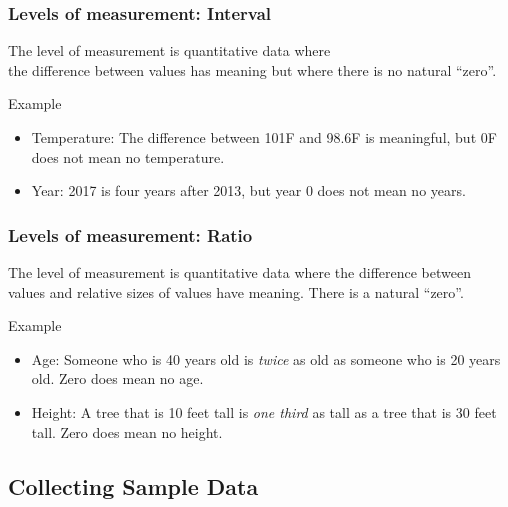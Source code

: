 \documentclass[xcolor=table, handout]{beamer}
\begin{document}
\begin{frame}
\frametitle{Levels of measurement: Interval}
\begin{block}{}
\large The  level of measurement is quantitative data where\\ the difference between values has meaning but where there is no natural ``zero''.
\end{block}
\pause
\begin{exampleblock}{Example}
\begin{itemize}
\item Temperature: The difference between 101\textdegree F and 98.6\textdegree F is meaningful, but 0\textdegree F does not mean no temperature.
\item Year: 2017 is four years after 2013, but year 0 does not mean no years.
\end{itemize}
\end{exampleblock}
\end{frame}

\begin{frame}
\frametitle{Levels of measurement: Ratio}
\begin{block}{}
\large The  level of measurement is quantitative data where the difference between values and relative sizes of values have meaning. There is a natural ``zero''.
\end{block}
\pause
\begin{exampleblock}{Example}
\begin{itemize}
\item Age: Someone who is 40 years old is \emph{twice} as old as someone who is 20 years old. Zero does mean no age.

\item Height: A tree that is 10 feet tall is \emph{one third} as tall as a tree that is 30 feet tall. Zero does mean no height.
\end{itemize}

\end{exampleblock}
\end{frame}

\subsection{Collecting Sample Data}
\end{document}
